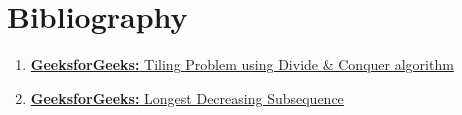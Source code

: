 \documentclass[12pt]{report}
\begin{document}
    \section*{Bibliography}
    \begin{enumerate}
        \item
        \href{
            https://www.geeksforgeeks.org/tiling-problem-using-divide-and-conquer-algorithm/
        }{\textbf{GeeksforGeeks:} Tiling Problem using Divide \& Conquer algorithm}
        \item
        \href{
            https://www.geeksforgeeks.org/longest-decreasing-subsequence/
        }{\textbf{GeeksforGeeks:} Longest Decreasing Subsequence}
     \end{enumerate}
\end{document}
